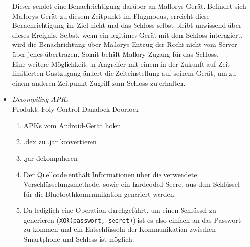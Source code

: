 \begin{itemize}[leftmargin=0cm,label={}]
                Dieser sendet eine Benachrichtigung darüber an Mallorys Gerät. 
                Befindet sich Mallorys Gerät zu diesem Zeitpunkt im Flugmodus, erreicht diese Benachrichtigung ihr Ziel nicht und das Schloss selbst bleibt unwissend über dieses Ereignis. 
                Selbst, wenn ein legitimes Gerät mit dem Schloss interagiert, wird die Benachrichtung über Mallorys Entzug der Recht nicht vom Server über jenes übertragen.
                Somit behält Mallory Zugang für das Schloss.\\
                Eine weitere Möglichkeit: in Angreifer mit einem in der Zukunft auf Zeit limitierten Gastzugang ändert die Zeiteinstellung auf seinem Gerät, um zu einem anderen Zeitpunkt Zugriff zum Schloss zu erhalten.
            \item \emph{Decompiling APKs}\cite{Rose2016}\label{vuln:decompile}\\
                Produkt: Poly-Control Danalock Doorlock
                \begin{enumerate}[noitemsep]
    	            \item APKs vom Android-Gerät holen
    	            \item .dex zu .jar konvertieren
    	            \item .jar dekompilieren
    	            \item Der Quellcode enthält Informationen über die verwendete Verschlüsselungsmethode, sowie ein hardcoded Secret aus dem Schlüssel für die Bluetoothkommunikation generiert werden.
    	            \item Da lediglich eine Operation durchgeführt, um einen Schlüssel zu generieren (\sloppy\colorbox{light-gray}{\lstinline{XOR(passwort, secret)}}) ist es also einfach an das Passwort zu kommen und ein Entschlüsseln der Kommunikation zwischen Smartphone und Schloss ist möglich.
    	        \end{enumerate}
        \end{itemize}
        
